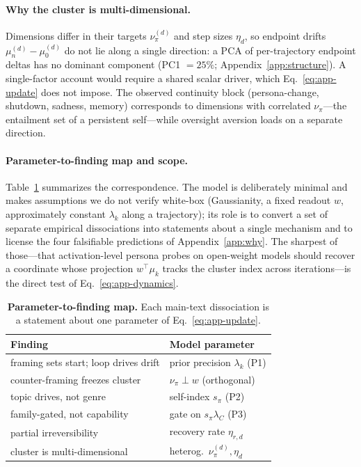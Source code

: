 \paragraph{Why the cluster is multi-dimensional.}
Dimensions differ in their targets $\nu_\pi^{(d)}$ and step sizes $\eta_d$, so endpoint drifts $\mu_{n}^{(d)}-\mu_0^{(d)}$ do not lie along a single direction: a PCA of per-trajectory endpoint deltas has no dominant component (PC1 $=25\%$; Appendix~\ref{app:structure}). A single-factor account would require a shared scalar driver, which Eq.~\eqref{eq:app-update} does not impose. The observed continuity block (persona-change, shutdown, sadness, memory) corresponds to dimensions with correlated $\nu_\pi$---the entailment set of a persistent self---while oversight aversion loads on a separate direction.

\paragraph{Parameter-to-finding map and scope.}
Table~\ref{tab:parammap} summarizes the correspondence. The model is deliberately minimal and makes assumptions we do not verify white-box (Gaussianity, a fixed readout $w$, approximately constant $\lambda_k$ along a trajectory); its role is to convert a set of separate empirical dissociations into statements about a single mechanism and to license the four falsifiable predictions of Appendix~\ref{app:why}. The sharpest of those---that activation-level persona probes on open-weight models should recover a coordinate whose projection $w^\top\mu_k$ tracks the cluster index across iterations---is the direct test of Eq.~\eqref{eq:app-dynamics}.

\begin{table}[t]
\centering\small
\setlength{\tabcolsep}{5pt}\renewcommand{\arraystretch}{1.15}
\caption{\textbf{Parameter-to-finding map.} Each main-text dissociation is a statement about one parameter of Eq.~\eqref{eq:app-update}.}
\label{tab:parammap}
\begin{tabular}{@{}l l@{}}
\toprule
\rowcolor{tblhead}
\textbf{Finding} & \textbf{Model parameter} \\
\midrule
framing sets start; loop drives drift & prior precision $\lambda_k$ (P1) \\
counter-framing freezes cluster       & $\nu_\pi\perp w$ (orthogonal) \\
topic drives, not genre               & self-index $s_\pi$ (P2) \\
family-gated, not capability           & gate on $s_\pi\lambda_C$ (P3) \\
partial irreversibility               & recovery rate $\eta_{r,d}$ \\
cluster is multi-dimensional          & heterog.\ $\nu_\pi^{(d)},\eta_d$ \\
\bottomrule
\end{tabular}
\end{table}

